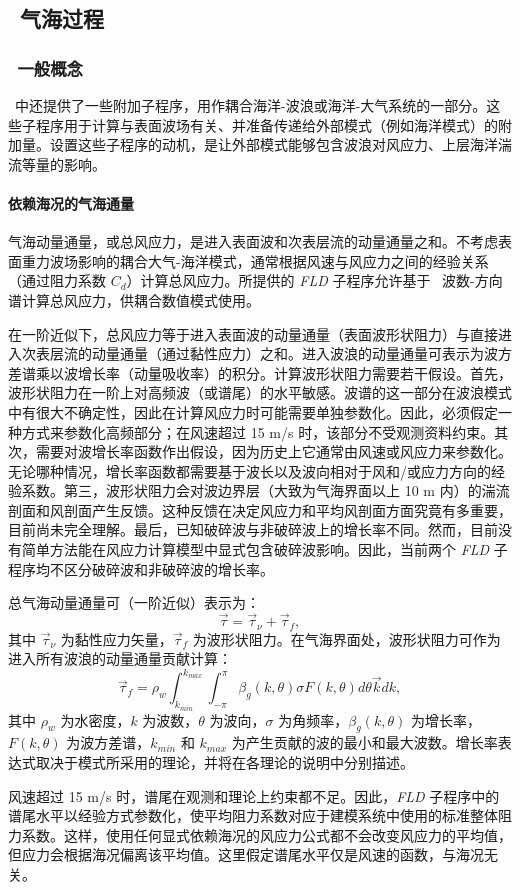 \vssub
\subsection{~气海过程}
\vsssub
\subsubsection{~一般概念}
\vsssub

\ws\ 中还提供了一些附加子程序，用作耦合海洋-波浪或海洋-大气系统的一部分。这些子程序用于计算与表面波场有关、并准备传递给外部模式（例如海洋模式）的附加量。设置这些子程序的动机，是让外部模式能够包含波浪对风应力、上层海洋湍流等量的影响。

\paragraph{依赖海况的气海通量}

气海动量通量，或总风应力，是进入表面波和次表层流的动量通量之和。不考虑表面重力波场影响的耦合大气-海洋模式，通常根据风速与风应力之间的经验关系（通过阻力系数 $C_d$）计算总风应力。所提供的 {\it FLD} 子程序允许基于 \ws\ 波数-方向谱计算总风应力，供耦合数值模式使用。

在一阶近似下，总风应力等于进入表面波的动量通量（表面波形状阻力）与直接进入次表层流的动量通量（通过黏性应力）之和。进入波浪的动量通量可表示为波方差谱乘以波增长率（动量吸收率）的积分。计算波形状阻力需要若干假设。首先，波形状阻力在一阶上对高频波（或谱尾）的水平敏感。波谱的这一部分在波浪模式中有很大不确定性，因此在计算风应力时可能需要单独参数化。因此，必须假定一种方式来参数化高频部分；在风速超过 15 m/s 时，该部分不受观测资料约束。其次，需要对波增长率函数作出假设，因为历史上它通常由风速或风应力来参数化。无论哪种情况，增长率函数都需要基于波长以及波向相对于风和/或应力方向的经验系数。第三，波形状阻力会对波边界层（大致为气海界面以上 10 m 内）的湍流剖面和风剖面产生反馈。这种反馈在决定风应力和平均风剖面方面究竟有多重要，目前尚未完全理解。最后，已知破碎波与非破碎波上的增长率不同。然而，目前没有简单方法能在风应力计算模型中显式包含破碎波影响。因此，当前两个 {\it FLD} 子程序均不区分破碎波和非破碎波的增长率。

总气海动量通量可（一阶近似）表示为：
\begin{equation}
\vec{\tau}=\vec{\tau}_{\nu}+\vec{\tau}_{f},
\end{equation}
其中 $\vec{\tau}_{\nu}$ 为黏性应力矢量，$\vec{\tau}_{f}$ 为波形状阻力。在气海界面处，波形状阻力可作为进入所有波浪的动量通量贡献计算：
\begin{equation}\label{formdrag}
\vec{\tau}_{f}=\rho_w\int_{k_{min}}^{k_{max}}\int_{-\pi}^{\pi} \beta_g(k,\theta) \sigma F (k,\theta) d\theta \vec{k} dk,
\end{equation}
其中 $\rho_w$ 为水密度，$k$ 为波数，$\theta$ 为波向，$\sigma$ 为角频率，$\beta_g (k,\theta)$ 为增长率，$F (k,\theta)$ 为波方差谱，$k_{min}$ 和 $k_{max}$ 为产生贡献的波的最小和最大波数。增长率表达式取决于模式所采用的理论，并将在各理论的说明中分别描述。

风速超过 15 m/s 时，谱尾在观测和理论上约束都不足。因此，{\it FLD} 子程序中的谱尾水平以经验方式参数化，使平均阻力系数对应于建模系统中使用的标准整体阻力系数。这样，使用任何显式依赖海况的风应力公式都不会改变风应力的平均值，但应力会根据海况偏离该平均值。这里假定谱尾水平仅是风速的函数，与海况无关。
